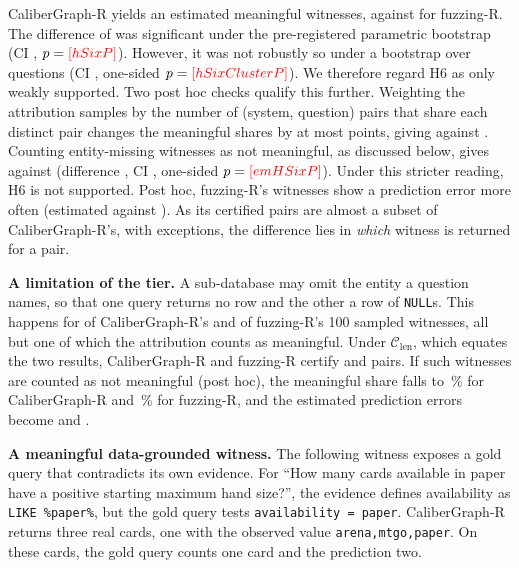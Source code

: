 CaliberGraph-R yields an estimated  meaningful witnesses, against  for fuzzing-R. The difference of  was significant under the pre-registered parametric bootstrap (CI , $p=\V{hSixP}$). However, it was not robustly so under a bootstrap over questions (CI , one-sided $p=\V{hSixClusterP}$). We therefore regard H6 as only weakly supported. Two post hoc checks qualify this further. Weighting the attribution samples by the number of (system, question) pairs that share each distinct pair changes the meaningful shares by at most  points, giving  against . Counting entity-missing witnesses as not meaningful, as discussed below, gives  against  (difference , CI , one-sided $p=\V{emHSixP}$). Under this stricter reading, H6 is not supported. Post hoc, fuzzing-R's witnesses show a prediction error more often (estimated  against ). As its certified pairs are almost a subset of CaliberGraph-R's, with  exceptions, the difference lies in \emph{which} witness is returned for a pair.

\textbf{A limitation of the tier.} A sub-database may omit the entity a question names, so that one query returns no row and the other a row of \texttt{NULL}s. This happens for  of CaliberGraph-R's and  of fuzzing-R's 100 sampled witnesses, all but one of which the attribution counts as meaningful. Under $\mathcal C_{\mathrm{len}}$, which equates the two results, CaliberGraph-R and fuzzing-R certify  and  pairs. If such witnesses are counted as not meaningful (post hoc), the meaningful share falls to \,\% for CaliberGraph-R and \,\% for fuzzing-R, and the estimated prediction errors become  and .

\textbf{A meaningful data-grounded witness.} The following witness exposes a gold query that contradicts its own evidence. For ``How many cards available in paper have a positive starting maximum hand size?'', the evidence defines availability as \texttt{LIKE \textquotesingle{}\%paper\%\textquotesingle{}}, but the gold query tests \texttt{availability = \textquotesingle{}paper\textquotesingle{}}. CaliberGraph-R returns three real cards, one with the observed value \texttt{\textquotesingle{}arena,mtgo,paper\textquotesingle{}}. On these cards, the gold query counts one card and the prediction two.

